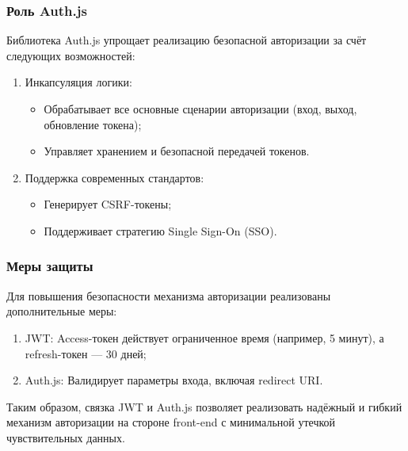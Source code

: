 \subsubsection{Роль Auth.js}
Библиотека Auth.js упрощает реализацию безопасной авторизации за счёт следующих возможностей:
\begin{enumerate}
  \item Инкапсуляция логики:
    \begin{itemize}
      \item Обрабатывает все основные сценарии авторизации (вход, выход, обновление токена);
      \item Управляет хранением и безопасной передачей токенов.
    \end{itemize}
  \item Поддержка современных стандартов:
    \begin{itemize}
      \item Генерирует CSRF-токены;
      \item Поддерживает стратегию Single Sign-On (SSO).
    \end{itemize}
\end{enumerate}

\subsubsection{Меры защиты}
Для повышения безопасности механизма авторизации реализованы дополнительные меры:

\begin{enumerate}
  \item JWT: Access-токен действует ограниченное время (например, 5 минут), а refresh-токен — 30 дней;
  \item Auth.js: Валидирует параметры входа, включая redirect URI.
\end{enumerate}

Таким образом, связка JWT и Auth.js позволяет реализовать надёжный и гибкий механизм авторизации на стороне front-end с минимальной утечкой чувствительных данных.